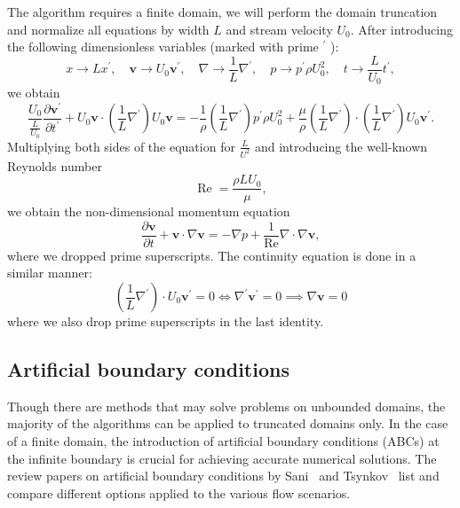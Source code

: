 \documentclass{article}
\begin{document}
The algorithm requires a finite domain, we will perform the domain truncation and normalize all equations by width $L$ and stream velocity $U_0$. After introducing the following dimensionless variables (marked with prime ${ }^{\prime}$ ):
\begin{equation*}
	x\to Lx^{\prime},  \quad 
	\boldsymbol{v}\to U_0\boldsymbol{v}^{\prime}, \quad 
	\nabla\to \frac{1}{L}\nabla^{\prime}, \quad 
	p\to p^{\prime} \rho U_0^2, \quad 
	t\to \frac{L}{U_0}t^{\prime},
\end{equation*}
we obtain
\begin{equation*}
	\frac{U_0}{\frac{L}{U_0}} \frac{\partial \boldsymbol{v}^{\prime}}{\partial t^{\prime}}+U_0\boldsymbol{v}\cdot\left(\frac{1}{L} \nabla^{\prime}\right) U_0\boldsymbol{v}=-\frac{1}{\rho}\left(\frac{1}{L} \nabla^{\prime}\right){p^{\prime}\rho U^2_0}+\frac{\mu}{\rho} \left(\frac{1}{L} \nabla^{\prime}\right) \cdot\left(\frac{1}{L} \nabla^{\prime}\right) U_0\boldsymbol{v}^{\prime}.
\end{equation*}
Multiplying both sides of the equation for $\frac{L}{U^2}$ and introducing the well-known Reynolds number 
\begin{equation*}
\operatorname{Re}=\frac{\rho L U_0}{\mu},
\end{equation*}
we obtain the non-dimensional momentum equation
\begin{equation}
	\frac{\partial \boldsymbol{v}}{\partial t} + \boldsymbol{v} \cdot \nabla \boldsymbol{v} = -\nabla p + \frac{1}{\operatorname{Re}} \nabla \cdot \nabla \boldsymbol{v},
\end{equation}
where we dropped prime superscripts. The continuity equation is done in a similar manner:
\begin{equation}
	\left(\frac{1}{L} \nabla^{\prime}\right) \cdot U_0\boldsymbol{v}^{\prime}=0\iff\nabla^{\prime}\boldsymbol{v}^{\prime}=0\implies\nabla\boldsymbol{v}=0
\end{equation}
where we also drop prime superscripts in the last identity.

\subsection{Artificial boundary conditions}\label{sec:artificial-bc}

Though there are methods that may solve problems on unbounded domains, the majority of the algorithms can be applied to truncated domains only. In the case of a finite domain, the introduction of artificial boundary conditions (ABCs) at the infinite boundary is crucial for achieving accurate numerical solutions. The review papers on artificial boundary conditions by Sani~\cite{Sani:1994} and Tsynkov~\cite{Tsynkov:1998} list and compare different options applied to the various flow scenarios. 
\end{document}
